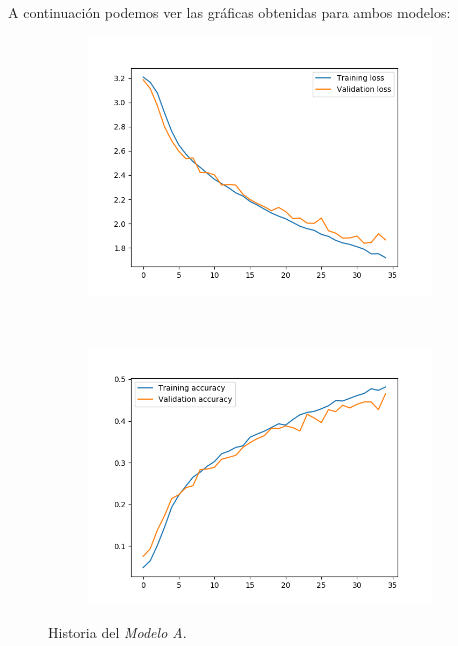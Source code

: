 \documentclass[11pt,a4paper]{article}
\begin{document}
A continuación podemos ver las gráficas obtenidas para ambos modelos:

\begin{figure}[H]
  \centering
  \begin{subfigure}{.5\textwidth}
    \includegraphics[scale=0.4]{img/deep1-drop-loss-35.png}
    \label{fig:deep1-drop-loss-35}
  \end{subfigure}%
  ~ \quad
  \begin{subfigure}{.5\textwidth}
    \includegraphics[scale=0.4]{img/deep1-drop-acc-35.png}
    \label{fig:deep1-drop-acc-35}
  \end{subfigure}
  \caption{Historia del \textit{Modelo A}.}
  \label{fig:history-deep1-drop-35}
\end{figure}
\end{document}
